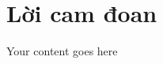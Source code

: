\documentclass[../main.tex]{subfiles}
\begin{document}
	\chapter*{Lời cam đoan}

	\justifying

	Your content goes here

	\newpage
\end{document}
